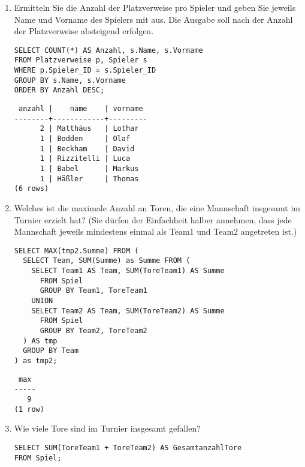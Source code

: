 \documentclass{lehramt-informatik-aufgabe}
\begin{document}
\begin{enumerate}


\item Ermitteln Sie die Anzahl der Platzverweise pro Spieler und geben
Sie jeweils Name und Vorname des Spielers mit aus. Die Ausgabe soll nach
der Anzahl der Platzverweise absteigend erfolgen.

\begin{liAntwort}
\begin{verbatim}
SELECT COUNT(*) AS Anzahl, s.Name, s.Vorname
FROM Platzverweise p, Spieler s
WHERE p.Spieler_ID = s.Spieler_ID
GROUP BY s.Name, s.Vorname
ORDER BY Anzahl DESC;
\end{verbatim}

\begin{verbatim}
 anzahl |    name    | vorname
--------+------------+---------
      2 | Matthäus   | Lothar
      1 | Bodden     | Olaf
      1 | Beckham    | David
      1 | Rizzitelli | Luca
      1 | Babel      | Markus
      1 | Häßler     | Thomas
(6 rows)
\end{verbatim}
\end{liAntwort}


\item Welches ist die maximale Anzahl an Toren, die eine Mannschaft
insgesamt im Turnier erzielt hat? (Sie dürfen der Einfachheit halber
annehmen, dass jede Mannschaft jeweils mindestens einmal als Team1 und
Team2 angetreten ist.)

\begin{liAntwort}
\begin{verbatim}
SELECT MAX(tmp2.Summe) FROM (
  SELECT Team, SUM(Summe) as Summe FROM (
    SELECT Team1 AS Team, SUM(ToreTeam1) AS Summe
      FROM Spiel
      GROUP BY Team1, ToreTeam1
    UNION
    SELECT Team2 AS Team, SUM(ToreTeam2) AS Summe
      FROM Spiel
      GROUP BY Team2, ToreTeam2
  ) AS tmp
  GROUP BY Team
) as tmp2;
\end{verbatim}

\begin{verbatim}
 max
-----
   9
(1 row)
\end{verbatim}
\end{liAntwort}


\item Wie viele Tore sind im Turnier insgesamt gefallen?

\begin{liAntwort}
\begin{verbatim}
SELECT SUM(ToreTeam1 + ToreTeam2) AS GesamtanzahlTore
FROM Spiel;
\end{verbatim}
\end{liAntwort}


\end{enumerate}
\end{document}
